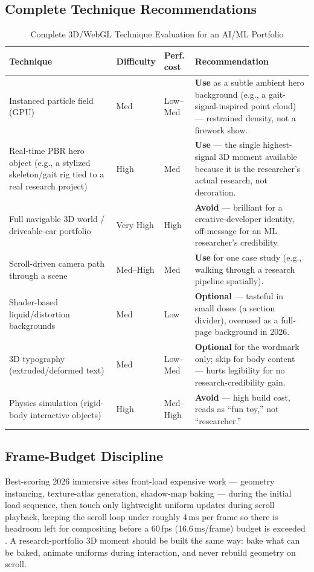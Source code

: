 \documentclass[conference]{IEEEtran}
\begin{document}
\subsection{Complete Technique Recommendations}
\begin{table}[t]
\centering
\caption{Complete 3D/WebGL Technique Evaluation for an AI/ML Portfolio}
\label{tab:3dtech_full}
\begin{tabular}{L{4.2cm}C{1.6cm}C{1.6cm}L{7.8cm}}
\toprule
\textbf{Technique} & \textbf{Difficulty} & \textbf{Perf. cost} & \textbf{Recommendation} \\
\midrule
Instanced particle field (GPU) & Med & Low--Med & \textbf{Use} as a subtle ambient hero background (e.g., a gait-signal-inspired point cloud) --- restrained density, not a firework show. \\
Real-time PBR hero object (e.g., a stylized skeleton/gait rig tied to a real research project) & High & Med & \textbf{Use} --- the single highest-signal 3D moment available because it is the researcher's actual research, not decoration. \\
Full navigable 3D world / driveable-car portfolio & Very High & High & \textbf{Avoid} --- brilliant for a creative-developer identity, off-message for an ML researcher's credibility. \\
Scroll-driven camera path through a scene & Med--High & Med & \textbf{Use} for one case study (e.g., walking through a research pipeline spatially). \\
Shader-based liquid/distortion backgrounds & Med & Low & \textbf{Optional} --- tasteful in small doses (a section divider), overused as a full-page background in 2026. \\
3D typography (extruded/deformed text) & Med & Low--Med & \textbf{Optional} for the wordmark only; skip for body content --- hurts legibility for no research-credibility gain. \\
Physics simulation (rigid-body interactive objects) & High & Med--High & \textbf{Avoid} --- high build cost, reads as ``fun toy,'' not ``researcher.'' \\
\bottomrule
\end{tabular}
\end{table}

\subsection{Frame-Budget Discipline}
Best-scoring 2026 immersive sites front-load expensive work --- geometry instancing, texture-atlas generation, shadow-map baking --- during the initial load sequence, then touch only lightweight uniform updates during scroll playback, keeping the scroll loop under roughly 4\,ms per frame so there is headroom left for compositing before a 60\,fps (16.6\,ms/frame) budget is exceeded \cite{dsf_2026}. A research-portfolio 3D moment should be built the same way: bake what can be baked, animate uniforms during interaction, and never rebuild geometry on scroll.
\end{document}
